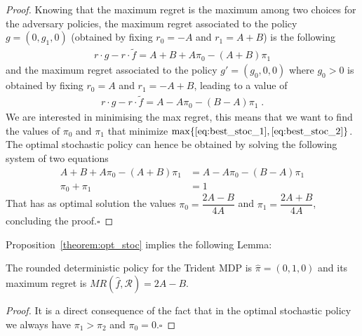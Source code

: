 \begin{proof}
Knowing that the maximum regret is the maximum among two choices for the adversary policies, the maximum regret associated to the policy $g =(0, g_1, 0)$ (obtained by fixing $r_0 = -A$ and $r_1 = A+B$) is the following
\begin{align}
r \cdot g - r \cdot \tilde{f} = A + B +A \pi_0 -(A+B)\pi_1 \label{eq:best_stoc_1}
\end{align}   
and the maximum regret associated to the policy $g' = (g_0, 0, 0)$ where $g_0 > 0$ is obtained by fixing $r_0 = A$ and $r_1 = -A+B$, leading to a value of
\begin{align}
r \cdot g - r \cdot \tilde{f}  = A - A \pi_0 -(B-A)\pi_1 \label{eq:best_stoc_2}\;.
\end{align}   
We are interested in minimising the max regret, this means that we want to find the values of $\pi_0$ and $\pi_1$ that minimize $\max \{\eqref{eq:best_stoc_1}, \eqref{eq:best_stoc_2}\}$. The optimal stochastic policy can hence be obtained by solving the following system of two equations 
\begin{align*}
A + B +A \pi_0 -(A+B)\pi_1 &= A - A \pi_0 -(B-A)\pi_1\\
\pi_0+\pi_1 &= 1
\end{align*} 
That has as optimal solution the values $\pi_{0}=\dfrac{2A - B}{4A}$ and $\pi_{1}=\dfrac{2A + B}{4A}$, concluding the proof.$\square$
\end{proof}


Proposition~\ref{theorem:opt_stoc} implies the following Lemma:
\begin{lemma}\label{lemma:heur_policy}
The rounded deterministic policy for the Trident MDP is $\hat{\pi} = (0, 1, 0)$ %
and its maximum regret is $MR(\hat{f}, \mathcal{R}) = 2A-B$.
\end{lemma}
\begin{proof}
It is a direct consequence of the fact that in the optimal stochastic policy we always have $\pi_1 > \pi_2$ and $\pi_0 = 0$.$\square$
\end{proof}

